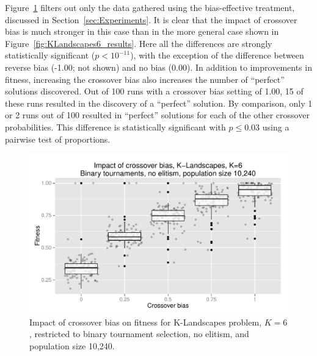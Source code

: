 \documentclass{sig-alternate}
\begin{document}
Figure~\ref{fig:KLandscapes6_strong_results} filters out only the data gathered using the bias-effective treatment,
discussed in Section~\ref{sec:Experiments}. It is clear that the impact of crossover bias is much stronger in this case
than in the more general case shown in Figure~\ref{fig:KLandscapes6_results}. Here all the differences are strongly
statistically significant ($p < 10^{-11}$), with the exception of the difference between reverse bias (-1.00; not shown)
and no bias (0.00). In addition to improvements in fitness, increasing the crossover bias also increases the number of
``perfect'' solutions discovered. Out of 100 runs with a crossover bias setting of 1.00, 15 of these runs resulted in
the discovery of a ``perfect'' solution. By comparison, only 1 or 2 runs out of 100 resulted in ``perfect'' solutions
for each of the other crossover probabilities. This difference is statistically significant with $p \leq 0.03$ using a
pairwise test of proportions.

\begin{figure}
\centering
\includegraphics[width=0.45 \textwidth]{Plots/KLandscapes6_XO_bias_strong_impact_alpha_075.pdf}
\caption{Impact of crossover bias on fitness for K-Landscapes problem, $K=6$, restricted to binary tournament
selection, no elitism, and population size 10,240.}
\label{fig:KLandscapes6_strong_results}
\end{figure}

%
%
%
%

%
%
%
%
\end{document}
